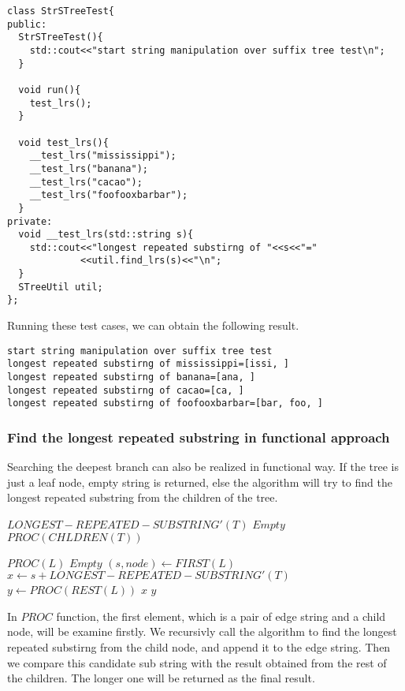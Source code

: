 \documentclass{article}
\begin{document}
\begin{lstlisting}
class StrSTreeTest{
public:
  StrSTreeTest(){
    std::cout<<"start string manipulation over suffix tree test\n";
  }

  void run(){
    test_lrs();
  }

  void test_lrs(){
    __test_lrs("mississippi");
    __test_lrs("banana");
    __test_lrs("cacao");
    __test_lrs("foofooxbarbar");
  }
private:
  void __test_lrs(std::string s){
    std::cout<<"longest repeated substirng of "<<s<<"="
             <<util.find_lrs(s)<<"\n";
  }
  STreeUtil util;
};
\end{lstlisting}

Running these test cases, we can obtain the following result.
\begin{verbatim}
start string manipulation over suffix tree test
longest repeated substirng of mississippi=[issi, ]
longest repeated substirng of banana=[ana, ]
longest repeated substirng of cacao=[ca, ]
longest repeated substirng of foofooxbarbar=[bar, foo, ]
\end{verbatim}

\subsubsection{Find the longest repeated substring in functional approach}
Searching the deepest branch can also be realized in functional way.
If the tree is just a leaf node, empty string is returned, else the
algorithm will try to find the longest repeated substring from the 
children of the tree.

\begin{algorithmic}
\STATE $LONGEST-REPEATED-SUBSTRING'(T)$
    \RETURN $Empty$
  \ELSE
    \RETURN $PROC(CHLDREN(T))$
  \ENDIF
\end{algorithmic}

\begin{algorithmic}
\STATE $PROC(L)$
    \RETURN $Empty$
  \ELSE
    \STATE $(s, node) \leftarrow FIRST(L)$
    \STATE $x \leftarrow s + LONGEST-REPEATED-SUBSTRING'(T)$
    \STATE $y \leftarrow PROC(REST(L))$
      \RETURN $x$
    \ELSE
      \RETURN $y$
    \ENDIF
  \ENDIF
\end{algorithmic}

In $PROC$ function, the first element, which is a pair of edge string
and a child node, will be examine firstly. We recursivly call the 
algorithm to find the longest repeated substirng from the child node,
and append it to the edge string. Then we compare this candidate
sub string with the result obtained from the rest of the children.
The longer one will be returned as the final result.
\end{document}

